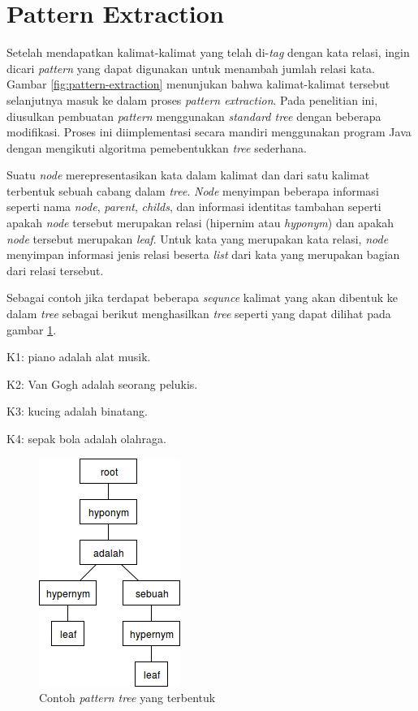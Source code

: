 %
\section{Pattern Extraction}
Setelah mendapatkan kalimat-kalimat yang telah di-\textit{tag} dengan kata relasi, ingin dicari \textit{pattern} yang dapat digunakan untuk menambah jumlah relasi kata. Gambar \ref{fig:pattern-extraction} menunjukan bahwa kalimat-kalimat tersebut selanjutnya masuk ke dalam proses \textit{pattern extraction}. Pada penelitian ini, diusulkan pembuatan \textit{pattern} menggunakan \textit{standard tree} dengan beberapa modifikasi. Proses ini diimplementasi secara mandiri menggunakan program Java dengan mengikuti algoritma pemebentukkan \textit{tree} sederhana.

Suatu \textit{\textit{node}} merepresentasikan kata dalam kalimat dan dari satu kalimat terbentuk sebuah cabang dalam \textit{tree}. \textit{Node} menyimpan beberapa informasi seperti nama \textit{\textit{node}}, \textit{parent}, \textit{childs}, dan informasi identitas tambahan seperti apakah \textit{\textit{node}} tersebut merupakan relasi (hipernim atau \textit{hyponym}) dan apakah \textit{\textit{node}} tersebut merupakan \textit{leaf}. Untuk kata yang merupakan kata relasi, \textit{\textit{node}} menyimpan informasi jenis relasi beserta \textit{list} dari kata yang merupakan bagian dari relasi tersebut. 

Sebagai contoh jika terdapat beberapa \textit{sequnce} kalimat yang akan dibentuk ke dalam \textit{tree} sebagai berikut menghasilkan \textit{tree} seperti yang dapat dilihat pada gambar \ref{fig:contoh-ptree}.

K1: {\tagHyponym}piano{\tagHyponym} adalah {\tagHypernym}alat musik{\tagHypernym}.

K2: {\tagHyponym}Van Gogh{\tagHyponym} adalah seorang {\tagHypernym} pelukis{\tagHypernym}.

K3: {\tagHyponym}kucing{\tagHyponym} adalah {\tagHypernym}binatang{\tagHypernym}.

K4: {\tagHyponym}sepak bola{\tagHyponym} adalah {\tagHypernym} olahraga{\tagHypernym}.

\begin{figure}
    \centering
    \includegraphics[scale=0.7]{pics/contoh-patterntree}
    \caption{Contoh \textit{pattern tree} yang terbentuk}
    \label{fig:contoh-ptree}
\end{figure}


